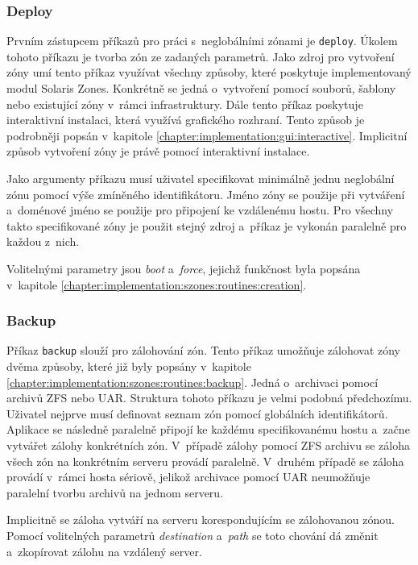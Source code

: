 \subsubsection{Deploy}
\label{chapter:implementation:client:cli:deploy}
Prvním zástupcem příkazů pro práci s~neglobálními zónami je \verb|deploy|. Úkolem tohoto příkazu je tvorba zón ze zadaných parametrů.
Jako zdroj pro vytvoření zóny umí tento příkaz využívat všechny způsoby, které poskytuje implementovaný modul Solaris Zones.
Konkrétně se jedná o~vytvoření pomocí souborů, šablony nebo existující zóny v~rámci infrastruktury. Dále tento příkaz poskytuje
interaktivní instalaci, která využívá grafického rozhraní. Tento způsob je podrobněji popsán v~kapitole
\ref{chapter:implementation:gui:interactive}. Implicitní způsob vytvoření zóny je právě pomocí interaktivní instalace.

Jako argumenty příkazu musí uživatel specifikovat minimálně jednu neglobální zónu pomocí výše zmíněného identifikátoru. Jméno zóny 
se použije při vytváření a~doménové jméno se použije pro připojení ke vzdálenému hostu. Pro všechny takto specifikované zóny
je použit stejný zdroj a~příkaz je vykonán paralelně pro každou z~nich.

Volitelnými parametry jsou \textit{boot} a~\textit{force}, jejichž funkčnost byla popsána v~kapitole \ref{chapter:implementation:szones:routines:creation}.
\subsubsection{Backup}
\label{chapter:implementation:client:cli:backup}
Příkaz \verb|backup| slouží pro zálohování zón. Tento příkaz umožňuje zálohovat zóny dvěma způsoby, které již
byly popsány v~kapitole \ref{chapter:implementation:szones:routines:backup}. Jedná o~archivaci pomocí archivů ZFS nebo UAR.
Struktura tohoto příkazu je velmi podobná předchozímu. Uživatel nejprve musí definovat seznam zón pomocí globálních
identifikátorů. Aplikace se následně paralelně připojí ke každému specifikovanému hostu a~začne vytvářet zálohy konkrétních zón. 
V~případě zálohy pomocí ZFS archivu se záloha všech zón na konkrétním serveru provádí paralelně. V~druhém případě se záloha provádí v~rámci
hosta sériově, jelikož archivace pomocí UAR neumožňuje paralelní tvorbu archivů na jednom serveru.

Implicitně se záloha vytváří na serveru korespondujícím se zálohovanou zónou. Pomocí volitelných parametrů \textit{destination}
a~\textit{path} se toto chování dá změnit a~zkopírovat zálohu na vzdálený server.
